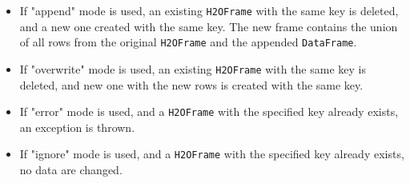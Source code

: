 \begin{itemize}
\item If "append" mode is used, an existing \texttt{H2OFrame} with the same key is deleted, and a new one created with the same key. The new frame contains the union of all rows from the original \texttt{H2OFrame} and the appended \texttt{DataFrame}.
\item If "overwrite" mode is used, an existing \texttt{H2OFrame} with the same key is deleted, and new one with the new rows is created with the same key.
\item If "error" mode is used, and a \texttt{H2OFrame} with the specified key already exists, an exception is thrown.
\item If "ignore" mode is used, and a \texttt{H2OFrame} with the specified key already exists, no data are changed.
\end{itemize}
